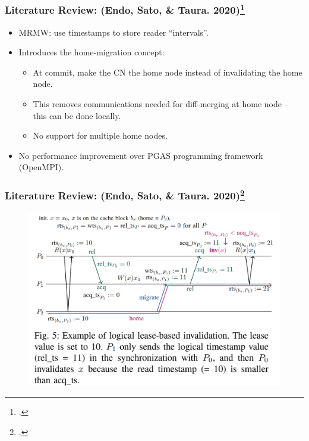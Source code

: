 \documentclass{beamer}
\begin{document}
\begin{frame}
    \frametitle{Literature Review: (Endo, Sato, \& Taura. 2020)\footcite{EndoWataru2020MADD}}
    \begin{itemize}
        \item MRMW: use timestamps to store reader ``intervals''.
        \item {
            Introduces the home-migration concept:
            \begin{itemize}
                \item At commit, make the CN the home node instead of invalidating the home node.
                \item This removes communications needed for diff-merging at home node -- this can be done locally.
                \item No support for multiple home nodes.
            \end{itemize}
        }
        \item {
            No performance improvement over PGAS programming framework (OpenMPI).
        }
    \end{itemize}
\end{frame}

\begin{frame}
    \frametitle{Literature Review: (Endo, Sato, \& Taura. 2020)\footcite{EndoWataru2020MADD}}
    \begin{figure}
        \includegraphics[width=\linewidth]{w12_slides_resources/menps.fig5.png}
    \end{figure}
\end{frame}
\end{document}

